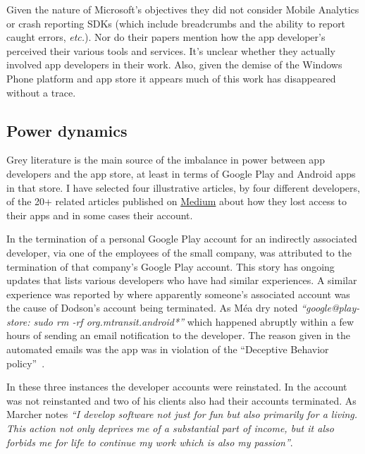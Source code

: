 Given the nature of Microsoft's objectives they did not consider Mobile Analytics or crash reporting SDKs (which include breadcrumbs and the ability to report caught errors, \emph{etc.}). Nor do their papers mention how the app developer's perceived their various tools and services. It's unclear whether they actually involved app developers in their work. Also, given the demise of the Windows Phone platform and app store it appears much of this work has disappeared without a trace.


\subsection{Power dynamics}
Grey literature is the main source of the imbalance in power between app developers and the app store, at least in terms of Google Play and Android apps in that store. I have selected four illustrative articles, by four different developers, of the 20+ related articles published on \href{https://medium.com/}{Medium} %
about how they lost access to their apps and in some cases their account. 

In \citet{martinez2019_google_just_terminated_our_startup_google_play_publisher_account_on_xmas_day} the termination of a personal Google Play account for an indirectly associated developer, via one of the employees of the small company, was attributed to the termination of that company's Google Play account. This story has ongoing updates that lists various developers who have had similar experiences. A similar experience was reported by \citet{dodson2019_google_completely_terminated_our_new_business_etc} where apparently someone's associated account was the cause of Dodson's account being terminated. As Méa dry noted \emph{``google@play-store: sudo rm -rf org.mtransit.android*''} which happened abruptly within a few hours of sending an email notification to the developer. The reason given in the automated emails was the app was in violation of the ``Deceptive Behavior policy''~\citep{mea2019_google_just_deleted_my_nearly_10_year_old_app_etc}. 

In these three instances the developer accounts were reinstated. In \citet{marcher2021_how_google_terminated-a-developer} the account was not reinstanted and two of his clients also had their accounts terminated. As Marcher notes \emph{``I develop software not just for fun but also primarily for a living. This action not only deprives me of a substantial part of income, but it also forbids me for life to continue my work which is also my passion''}. %


